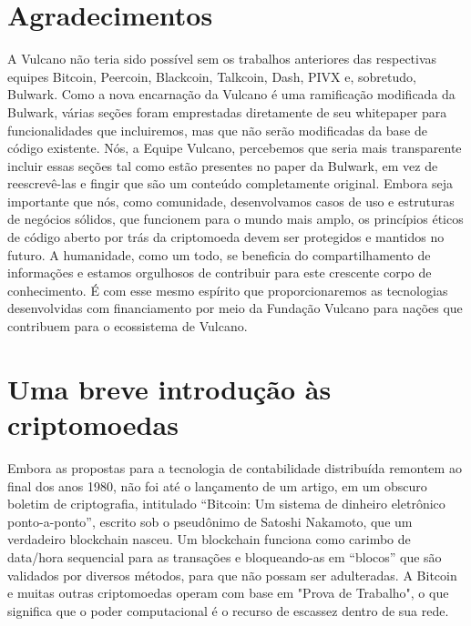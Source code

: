 \documentclass[A4paper, 12pt]{article}
\begin{document}
\section{Agradecimentos}
A Vulcano não teria sido possível sem os trabalhos anteriores das respectivas equipes Bitcoin, Peercoin, Blackcoin, Talkcoin, Dash, PIVX e, sobretudo, Bulwark. Como a nova encarnação da Vulcano é uma ramificação modificada da Bulwark, várias seções foram emprestadas diretamente de seu whitepaper para funcionalidades que incluiremos, mas que não serão modificadas da base de código existente. Nós, a Equipe Vulcano, percebemos que seria mais transparente incluir essas seções tal como estão presentes no paper da Bulwark, em vez de reescrevê-las e fingir que são um conteúdo completamente original. Embora seja importante que nós, como comunidade, desenvolvamos casos de uso e estruturas de negócios sólidos, que funcionem para o mundo mais amplo, os princípios éticos de código aberto por trás da criptomoeda devem ser protegidos e mantidos no futuro. A humanidade, como um todo, se beneficia do compartilhamento de informações e estamos orgulhosos de contribuir para este crescente corpo de conhecimento. É com esse mesmo espírito que proporcionaremos as tecnologias desenvolvidas com financiamento por meio da Fundação Vulcano para nações que contribuem para o ecossistema de Vulcano.

\section{Uma breve introdução às criptomoedas}
Embora as propostas para a tecnologia de contabilidade distribuída remontem ao final dos anos 1980, não foi até o lançamento de um artigo, em um obscuro boletim de criptografia, intitulado “Bitcoin: Um sistema de dinheiro eletrônico ponto-a-ponto”, escrito sob o pseudônimo de Satoshi Nakamoto, que um verdadeiro blockchain nasceu. Um blockchain funciona como carimbo de data/hora sequencial para as transações e bloqueando-as em “blocos” que são validados por diversos métodos, para que não possam ser adulteradas. A Bitcoin e muitas outras criptomoedas operam com base em "Prova de Trabalho", o que significa que o poder computacional é o recurso de escassez dentro de sua rede.
\end{document}
